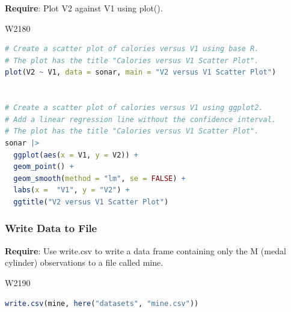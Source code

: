 \noindent\textbf{Require}: Plot V2 against V1 using plot().


\begin{ocg}{}{W218}{0}
\begin{lstlisting}[language = R]
# Create a scatter plot of calories versus V1 using base R.
# The plot has the title "Calories versus V1 Scatter Plot".
plot(V2 ~ V1, data = sonar, main = "V2 versus V1 Scatter Plot")


# Create a scatter plot of calories versus V1 using ggplot2.
# Add a linear regression line without the confidence interval.
# The plot has the title "Calories versus V1 Scatter Plot".
sonar |> 
  ggplot(aes(x = V1, y = V2)) +
  geom_point() + 
  geom_smooth(method = "lm", se = FALSE) +
  labs(x =  "V1", y = "V2") +
  ggtitle("V2 versus V1 Scatter Plot")
\end{lstlisting}
\end{ocg}

\subsubsection{Write Data to File}

\noindent\textbf{Require}: Use write.csv to write a data frame containing only the M (medal cylinder) observations to a file called mine.


\begin{ocg}{}{W219}{0}
\begin{lstlisting}[language = R]
write.csv(mine, here("datasets", "mine.csv"))
\end{lstlisting}
\end{ocg}
